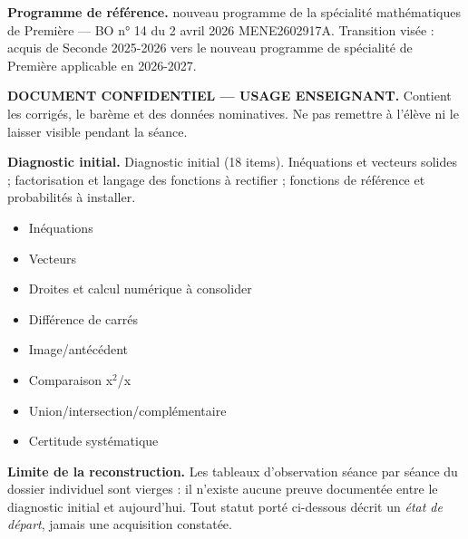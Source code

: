 \documentclass[10pt,a4paper]{article}
\begin{document}
\begin{methodbox}\small\textbf{Programme de référence.} nouveau programme de la spécialité mathématiques de Première --- BO n° 14 du 2 avril 2026 MENE2602917A. Transition visée : acquis de Seconde 2025-2026 vers le nouveau programme de spécialité de Première applicable en 2026-2027.\end{methodbox}
\begin{keybox}\textbf{DOCUMENT CONFIDENTIEL --- USAGE ENSEIGNANT.} Contient les corrigés, le barème et des données nominatives. Ne pas remettre à l'élève ni le laisser visible pendant la séance.\end{keybox}
\begin{methodbox}
\textbf{Diagnostic initial.} Diagnostic initial (18 items). Inéquations et vecteurs solides ; factorisation et langage des fonctions à rectifier ; fonctions de référence et probabilités à installer.
\end{methodbox}
\begin{itemize}\item Inéquations\item Vecteurs\item Droites et calcul numérique à consolider\end{itemize}
\begin{itemize}\item Différence de carrés\item Image/antécédent\item Comparaison x$^2$/x\item Union/intersection/complémentaire\item Certitude systématique\end{itemize}
\begin{warningbox}\textbf{Limite de la reconstruction.} Les tableaux d'observation séance par séance du dossier individuel sont vierges : il n'existe aucune preuve documentée entre le diagnostic initial et aujourd'hui. Tout statut porté ci-dessous décrit un \emph{état de départ}, jamais une acquisition constatée.\end{warningbox}
\newpage{}
\end{document}
